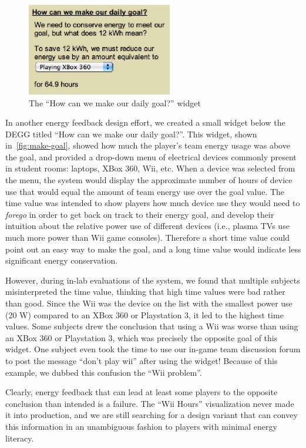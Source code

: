 \documentclass[10pt, conference, compsocconf]{IEEEtran}
\begin{document}
\begin{figure}[!tb]
	\centering
	\includegraphics[width=2.5in]{how-meet-goal.eps}
	\caption{The ``How can we make our daily goal?'' widget}
	\label{fig:make-goal}
\end{figure}

In another energy feedback design effort, we created a small widget below the DEGG titled ``How can we make our daily goal?''. This widget, shown in~\autoref{fig:make-goal}, showed how much the player's team energy usage was above the goal, and provided a drop-down menu of electrical devices commonly present in student rooms: laptops, XBox 360, Wii, etc. When a device was selected from the menu, the system would display the approximate number of hours of device use that would equal the amount of team energy use over the goal value. The time value was intended to show players how much device use they would need to \emph{forego} in order to get back on track to their energy goal, and develop their intuition about the relative power use of different devices (i.e., plasma TVs use much more power than Wii game consoles). Therefore a short time value could point out an easy way to make the goal, and a long time value would indicate less significant energy conservation.

However, during in-lab evaluations of the system, we found that multiple subjects misinterpreted the time value, thinking that high time values were bad rather than good. Since the Wii was the device on the list with the smallest power use (20 W) compared to an XBox 360 or Playstation 3, it led to the highest time values. Some subjects drew the conclusion that using a Wii was worse than using an XBox 360 or Playstation 3, which was precisely the opposite goal of this widget. One subject even took the time to use our in-game team discussion forum to post the message ``don't play wii'' after using the widget! Because of this example, we dubbed this confusion the ``Wii problem''.

Clearly, energy feedback that can lead at least some players to the opposite conclusion than intended is a failure. The ``Wii Hours'' visualization never made it into production, and we are still searching for a design variant that can convey this information in an unambiguous fashion to players with minimal energy literacy.
\end{document}
